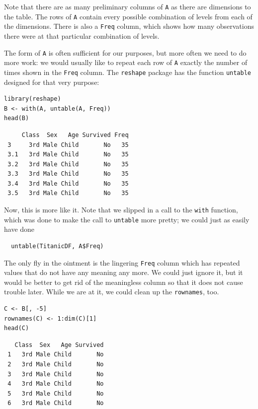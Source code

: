 \documentclass[captions=tableheading]{scrbook}
\begin{document}
\begin{example}
Note that there are as many preliminary columns of \texttt{A} as there are dimensions to the table. The rows of \texttt{A} contain every possible combination of levels from each of the dimensions. There is also a \texttt{Freq} column, which shows how many observations there were at that particular combination of levels. 

The form of \texttt{A} is often sufficient for our purposes, but more often we need to do more work: we would usually like to repeat each row of \texttt{A} exactly the number of times shown in the \texttt{Freq} column. The \texttt{reshape} package \cite{Wickhamreshape} has the function \texttt{untable} designed for that very purpose: 


\begin{verbatim}
library(reshape)
B <- with(A, untable(A, Freq))
head(B)
\end{verbatim}

\begin{verbatim}
     Class  Sex   Age Survived Freq
 3     3rd Male Child       No   35
 3.1   3rd Male Child       No   35
 3.2   3rd Male Child       No   35
 3.3   3rd Male Child       No   35
 3.4   3rd Male Child       No   35
 3.5   3rd Male Child       No   35
\end{verbatim}

Now, this is more like it. Note that we slipped in a call to the \texttt{with} function, which was done to make the call to \texttt{untable} more pretty; we could just as easily have done
\begin{verbatim}
  untable(TitanicDF, A$Freq)
\end{verbatim}


The only fly in the ointment is the lingering \texttt{Freq} column which has repeated values that do not have any meaning any more. We could just ignore it, but it would be better to get rid of the meaningless column so that it does not cause trouble later. While we are at it, we could clean up the \texttt{rownames}, too.


\begin{verbatim}
C <- B[, -5]
rownames(C) <- 1:dim(C)[1]
head(C)
\end{verbatim}

\begin{verbatim}
   Class  Sex   Age Survived
 1   3rd Male Child       No
 2   3rd Male Child       No
 3   3rd Male Child       No
 4   3rd Male Child       No
 5   3rd Male Child       No
 6   3rd Male Child       No
\end{verbatim}

\end{example}
\end{document}
